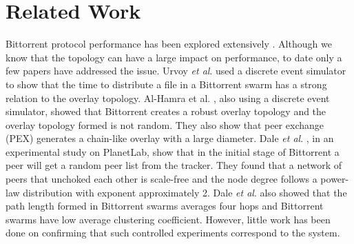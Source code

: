 \documentclass[paper]{ieice}
\begin{document}
\section{Related Work}\label{relatedworks}
Bittorrent protocol performance has been explored extensively \cite{guo2005measurements}\cite{legout2006rarest}\cite{pouwelse2004measurement}\cite{tian2007modeling}\cite{li2010measurement}\cite{zhang2010bittorrent}.  
Although we know that the topology can have a large impact on performance, to date only a few papers have addressed the issue.
Urvoy \textit{et al}. \cite{urvoy2007impact} used a discrete event simulator to show that the time to distribute a file in a Bittorrent swarm has a strong relation to the overlay topology.  
Al-Hamra et al. \cite{al2007understanding}, also using a discrete event simulator, showed that Bittorrent creates a robust overlay topology and the overlay topology formed is not random. 
They also show that peer exchange (PEX) generates a chain-like overlay with a large diameter. 
Dale \textit{et al}. \cite{dale2008evolution}, in an experimental study on PlanetLab, show that in the initial stage of Bittorrent a peer will get a random peer list from the tracker. 
They found that a network of peers that unchoked each other is scale-free and the node degree follows a power-law distribution with exponent approximately 2. 
Dale \textit{et al}. \cite{dale2008evolution} also showed that the path length formed in Bittorrent swarms averages four hops and Bittorrent swarms have low average clustering coefficient.  
However, little work has been done on confirming that such controlled experiments correspond to the system. %
\end{document}
